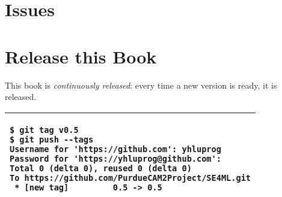 \clearpage

\section{Issues}

\section{Release this Book}

This book is {\it continuously released}: every time
a new version is ready, it is released.

\vspace{0.2in}
\noindent
\begin{tabular}{|p{5.5in}|}\hline
\begin{verbatim}
$ git tag v0.5
$ git push --tags
Username for 'https://github.com': yhluprog
Password for 'https://yhluprog@github.com': 
Total 0 (delta 0), reused 0 (delta 0)
To https://github.com/PurdueCAM2Project/SE4ML.git
 * [new tag]         0.5 -> 0.5
\end{verbatim}
\\ \hline
\end{tabular}
\vspace{0.2in}




